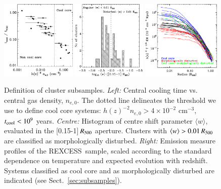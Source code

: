 \documentclass[oldversion]{aa}
\newcommand{\rexcess}{{\gwpfont REXCESS}}
\begin{document}
{%
\begin{figure}[]
\begin{centering}
\includegraphics[scale=1.,angle=0,keepaspectratio,width=0.32\textwidth]{0944f1a.eps}
\hfill
\includegraphics[scale=1.,angle=0,keepaspectratio,width=0.315\textwidth]{0944f1b.eps}
\hfill
\includegraphics[scale=1.,angle=0,keepaspectratio,width=0.335\textwidth]{0944f1c.eps}
\caption{{\footnotesize Definition of cluster subsamples. {\it Left:} Central cooling time vs. central gas density, $n_{e,0}$. The dotted line
    delineates the threshold we use to define cool core systems: $h(z)^{-2} n_{e,0} > 4 \times 10^{-2}$ cm$^{-3}$, $t_{\rm cool} < 10^9$ years. {\it Centre:} Histogram of centre shift parameter $\langle w \rangle$, evaluated in the [0.15-1]\,$R_{500}$ aperture. Clusters with $\langle w \rangle > 0.01\,R_{500}$ are classified as morphologically disturbed. {\it Right:} Emission measure profiles of the
  \rexcess\ sample, scaled according to the standard dependence on temperature and expected evolution with redshift. Systems classified as cool core and as morphologically disturbed are indicated (see Sect.~\ref{sec:subsamples}).}}\label{fig:tci0}   
\end{centering}
\end{figure}

}
\end{document}
